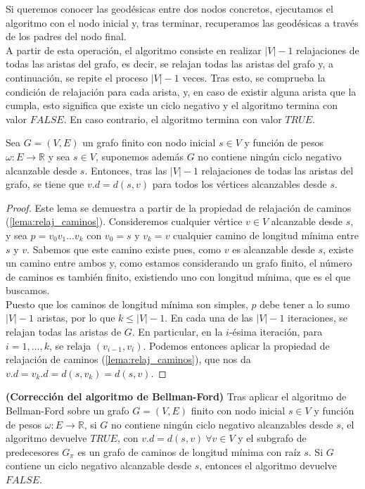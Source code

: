 Si queremos conocer las geodésicas entre dos nodos concretos, ejecutamos el algoritmo con el nodo inicial y, tras terminar, recuperamos las geodésicas a través de los padres del nodo final. \\

A partir de esta operación, el algoritmo consiste en realizar $|V|-1$ relajaciones de todas las aristas del grafo, es decir, se relajan todas las aristas del grafo y, a continuación, se repite el proceso $|V|-1$ veces. Tras esto, se comprueba la condición de relajación para cada arista, y, en caso de existir alguna arista que la cumpla, esto significa que existe un ciclo negativo y el algoritmo termina con valor $FALSE$. En caso contrario, el algoritmo termina con valor $TRUE$. \\

\begin{lema}\label{lema:corr_Bell_Ford}
	Sea $G=(V,E)$ un grafo finito con nodo inicial $s\in V$ y función de pesos $\omega : E\rightarrow \mathbb{R}$ y sea $s\in V$, suponemos además $G$ no contiene ningún ciclo negativo alcanzable desde $s$. Entonces, tras las $|V|-1$ relajaciones de todas las aristas del grafo, se tiene que $v.d = d(s,v)$ para todos los vértices alcanzables desde $s$.
\end{lema}

\begin{proof}
	Este lema se demuestra a partir de la propiedad de relajación de caminos (\autoref{lema:relaj_caminos}). Consideremos cualquier vértice $v\in V$ alcanzable desde $s$, y sea $p = v_0v_1...v_k$ con $v_0=s$ y $v_k=v$ cualquier camino de longitud mínima entre $s$ y $v$. Sabemos que este camino existe pues, como $v$ es alcanzable desde $s$, existe un camino entre ambos y, como estamos considerando un grafo finito, el número de caminos es también finito, existiendo uno con longitud mínima, que es el que buscamos. \\
	Puesto que los caminos de longitud mínima son simples, $p$ debe tener a lo sumo $|V|-1$ aristas, por lo que $k\leq|V|-1$. En cada una de las $|V|-1$ iteraciones, se relajan todas las aristas de $G$. En particular, en la $i$-ésima iteración, para $i=1,...,k$, se relaja $(v_{i-1},v_i)$. Podemos entonces aplicar la propiedad de relajación de caminos (\autoref{lema:relaj_caminos}), que nos da $v.d=v_k.d=d(s,v_k)=d(s,v)$.
\end{proof}

\begin{proposicion}
	\textbf{(Corrección del algoritmo de Bellman-Ford)} Tras aplicar el algoritmo de Bellman-Ford sobre un grafo $G=(V,E)$ finito con nodo inicial $s\in V$ y función de pesos $\omega : E\rightarrow \mathbb{R}$, si $G$ no contiene ningún ciclo negativo alcanzables desde $s$, el algoritmo devuelve $TRUE$, con $v.d=d(s,v)\ \forall v\in V$ y el subgrafo de predecesores $G_{\pi}$ es un grafo de caminos de longitud mínima con raíz $s$. Si $G$ contiene un ciclo negativo alcanzable desde $s$, entonces el algoritmo devuelve $FALSE$.
\end{proposicion}

